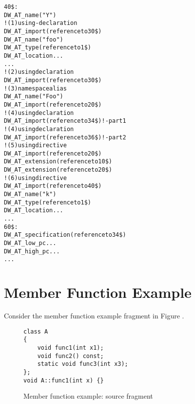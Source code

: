 \begin{alltt}
40\$: 
        DW\_AT\_name("Y")
            ! (1) using-declaration
            DW\_AT\_import(reference to 30\$)
            DW\_AT\_name("foo")
            DW\_AT\_type(reference to 1\$)
            DW\_AT\_location ...
            ...
            ! (2) using declaration
        DW\_AT\_import(reference to 30\$)
            ! (3) namespace alias
            DW\_AT\_name("Foo")
            DW\_AT\_import(reference to 20\$)
            ! (4) using declaration
            DW\_AT\_import(reference to 34\$) ! - part 1
            ! (4) using declaration
            DW\_AT\_import(reference to 36\$) !  - part 2
                 ! (5) using directive
            DW\_AT\_import(reference to 20\$)
            DW\_AT\_extension(reference to 10\$)
                DW\_AT\_extension(reference to 20\$)
                 ! (6) using directive
                    DW\_AT\_import(reference to 40\$)
                    DW\_AT\_name("k")
                    DW\_AT\_type(reference to 1\$)
                    DW\_AT\_location ...
                    ...
60\$: 
        DW\_AT\_specification(reference to 34\$)
        DW\_AT\_low\_pc ...
        DW\_AT\_high\_pc ...
        ...
\end{alltt}

\section{Member Function Example}
\label{app:memberfunctionexample}

Consider the member function example fragment in 
Figure .

\begin{figure}[here]
\begin{lstlisting}
class A
{
    void func1(int x1);
    void func2() const;
    static void func3(int x3);
};
void A::func1(int x) {}
\end{lstlisting}
\caption{Member function example: source fragment} \label{fig:memberfunctionexamplesourcefragment}
\end{figure}



